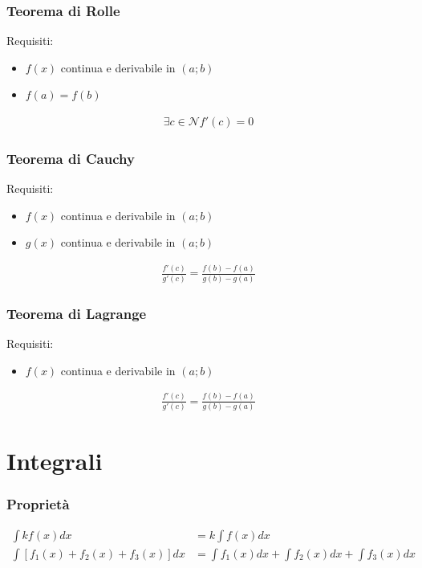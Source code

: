 \documentclass[a4paper]{article}
\begin{document}
	\subsubsection*{Teorema di Rolle}
	Requisiti:
	\begin{itemize}
		\item $f(x)$ continua e derivabile in $(a;b)$
		\item $f(a) = f(b)$
	\end{itemize}
	\begin{align*}
		\exists c \in \mathcal{N} f'(c) = 0
	\end{align*}
	\subsubsection*{Teorema di Cauchy}
	Requisiti:
	\begin{itemize}
		\item $f(x)$ continua e derivabile in $(a;b)$
		\item $g(x)$ continua e derivabile in $(a;b)$
	\end{itemize}
	\begin{align*}
	\frac{f'(c)}{g'(c)} = \frac{f(b)-f(a)}{g(b)-g(a)}
	\end{align*}
	
	\subsubsection*{Teorema di Lagrange}
	Requisiti:
	\begin{itemize}
		\item $f(x)$ continua e derivabile in $(a;b)$
	\end{itemize}
	\begin{align*}
	\frac{f'(c)}{g'(c)} = \frac{f(b)-f(a)}{g(b)-g(a)}
	\end{align*}
	
	
	\newpage
	\section{Integrali}
	\subsubsection*{Proprietà}
	\begin{align*}
		\int k f(x) dx &= k \int f(x) dx\\
		\int \left[f_1(x)+f_2(x)+f_3(x)\right]dx &= \int f_1(x)dx + \int f_2(x)dx + \int f_3(x)dx\\
	\end{align*}
	
\end{document}
